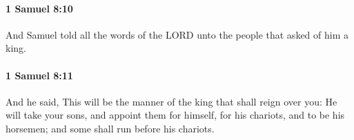 		\paragraph{1 Samuel 8:10} %
			\label{1SAMUEL-8-10}

			And Samuel told all the words of the LORD unto the people that asked of him a king.


		\paragraph{1 Samuel 8:11} %
			\label{1SAMUEL-8-11}

			And he said, This will be the manner of the king that shall reign over you: He will take your sons, and appoint them for himself, for his chariots, and to be his horsemen; and some shall run before his chariots.



